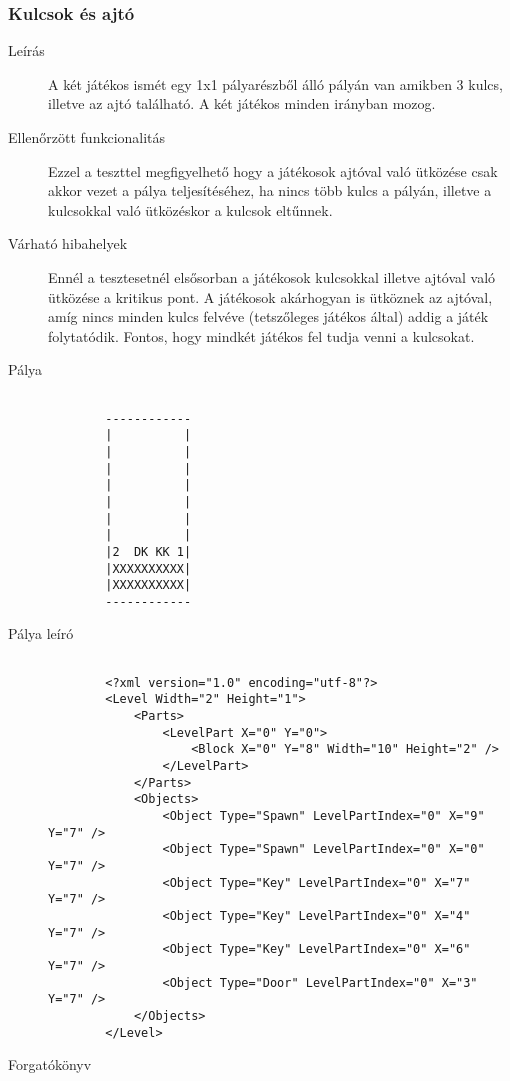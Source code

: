 \subsubsection{Kulcsok és ajtó}
\begin{description}
	
	\item[Leírás] A két játékos ismét egy  1x1 pályarészből álló pályán van amikben 3 kulcs, illetve az ajtó található. A két játékos minden irányban mozog.
	
	\item[Ellenőrzött funkcionalitás] Ezzel a teszttel megfigyelhető hogy a játékosok ajtóval való ütközése csak akkor vezet a pálya teljesítéséhez, ha nincs több kulcs a pályán, illetve a kulcsokkal való ütközéskor a kulcsok eltűnnek.
	
	\item[Várható hibahelyek] Ennél a tesztesetnél elsősorban a játékosok kulcsokkal illetve ajtóval való ütközése a kritikus pont. A játékosok akárhogyan is ütköznek az ajtóval, amíg nincs minden kulcs felvéve (tetszőleges játékos által) addig a játék folytatódik. Fontos, hogy mindkét játékos fel tudja venni a kulcsokat.

	\item[Pálya]
	\begin{verbatim}
	
		------------
		|          |
		|          |
		|          |
		|          |
		|          |
		|          |
		|          |
		|2  DK KK 1|
		|XXXXXXXXXX|
		|XXXXXXXXXX|
		------------	
	\end{verbatim}

	\item[Pálya leíró]
	\begin{verbatim}
	
		<?xml version="1.0" encoding="utf-8"?>
		<Level Width="2" Height="1">
		    <Parts>
		        <LevelPart X="0" Y="0">
		            <Block X="0" Y="8" Width="10" Height="2" />
		        </LevelPart>
		    </Parts>
		    <Objects>
		        <Object Type="Spawn" LevelPartIndex="0" X="9" Y="7" />
		        <Object Type="Spawn" LevelPartIndex="0" X="0" Y="7" />
		        <Object Type="Key" LevelPartIndex="0" X="7" Y="7" />
		        <Object Type="Key" LevelPartIndex="0" X="4" Y="7" />
		        <Object Type="Key" LevelPartIndex="0" X="6" Y="7" />
		        <Object Type="Door" LevelPartIndex="0" X="3" Y="7" />
		    </Objects>
		</Level>
	\end{verbatim}
	\newpage
	
	\item[Forgatókönyv]
	\begin{verbatim}


\end{verbatim}
\end{description}
